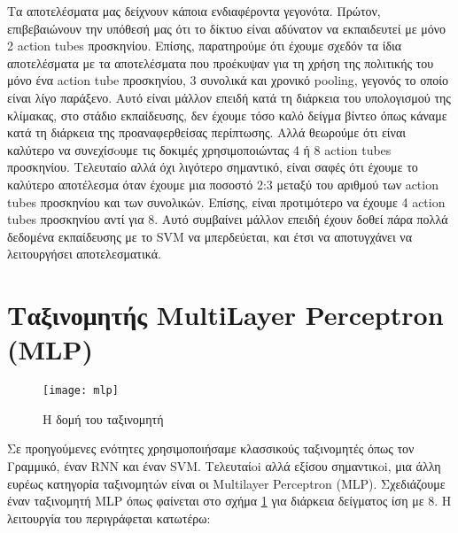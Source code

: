 Τα αποτελέσματα μας δείχνουν κάποια ενδιαφέροντα γεγονότα. Πρώτον, επιβεβαιώνουν την υπόθεσή μας
ότι το δίκτυο είναι αδύνατον να εκπαιδευτεί με μόνο 2 \en action tubes \gr προσκηνίου.
Επίσης, παρατηρούμε ότι έχουμε σχεδόν τα ίδια αποτελέσματα με
τα αποτελέσματα που προέκυψαν για τη χρήση της πολιτικής του μόνο ένα \en action tube \gr προσκηνίου, 3 συνολικά και
χρονικό \en pooling, \gr γεγονός το οποίο είναι λίγο παράξενο. Αυτό είναι μάλλον επειδή κατά τη διάρκεια του υπολογισμού της κλίμακας,
στο στάδιο εκπαίδευσης, δεν έχουμε τόσο
καλό δείγμα βίντεο όπως κάναμε κατά τη διάρκεια της προαναφερθείσας περίπτωσης. Αλλά θεωρούμε ότι είναι καλύτερο να συνεχίσoυμε
τις δοκιμές χρησιμοποιώντας 4 ή 8 \en action tubes \gr προσκηνίου. Τελευταίο
αλλά όχι λιγότερο σημαντικό, είναι σαφές ότι έχουμε το καλύτερο αποτέλεσμα όταν έχουμε μια ποσοστό 2:3
μεταξύ του αριθμού των \en action tubes \gr προσκηνίου και των συνολικών. Επίσης, είναι προτιμότερο
να έχουμε 4 \en action tubes \gr προσκηνίου αντί για 8. Αυτό συμβαίνει μάλλον επειδή έχουν δοθεί πάρα πολλά δεδομένα εκπαίδευσης με 
το \en SVM  \gr να μπερδεύεται, και έτσι να αποτυγχάνει να λειτουργήσει αποτελεσματικά.

\section{Ταξινομητής \en MultiLayer Perceptron (MLP)}
\begin{figure}[h]
  \en
  \centering
  \texttt{[image: mlp]}
  \caption{\gr Η δομή του ταξινομητή }
  \label{fig:gr_mlp_structure}
\end{figure}
\gr
Σε προηγούμενες ενότητες χρησιμοποιήσαμε κλασσικούς ταξινομητές όπως τον Γραμμικό, έναν \en RNN \gr και έναν \en SVM\gr.
Τελευταίoi αλλά εξίσου σημαντικoi, μια άλλη ευρέως κατηγορία ταξινομητών είναι οι \en Multilayer Perceptron (MLP)\gr.
Σχεδιάζουμε έναν ταξινομητή \en MLP \gr όπως φαίνεται στο σχήμα \ref{fig:gr_mlp_structure} για διάρκεια δείγματος ίση με 8. H
λειτουργία του περιγράφεται κατωτέρω:


